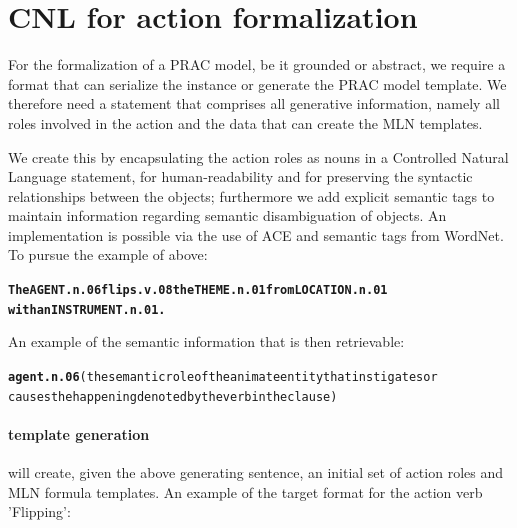 \documentclass[oribibl]{llncs}
\begin{document}
\section{CNL for action formalization}
For the formalization of a PRAC model, be it grounded or abstract, we require a format that can serialize the instance or generate the PRAC model template.
We therefore need a statement that comprises all generative information, namely all roles involved in the action and the data that can create the MLN templates.  

We create this by encapsulating the action roles as nouns in a Controlled Natural Language statement, for human-readability and for preserving the syntactic relationships between the objects; furthermore we add explicit semantic tags to maintain information regarding semantic disambiguation of objects.
An implementation is possible via the use of ACE and semantic tags from WordNet\cite{Miller95wordnet:a}. To pursue the example of above:
\begin{alltt}
\textbf{The AGENT.n.06 flips.v.08 the THEME.n.01 from LOCATION.n.01 \\with an INSTRUMENT.n.01.}
\end{alltt}
An example of the semantic information that is then retrievable:
{\small
\begin{alltt}
\textbf{agent.n.06} {\color{red}(the semantic role of the animate entity that instigates or 
causes the happening denoted by the verb in the clause)}
\end{alltt}}

\paragraph{template generation} will create, given the above generating sentence, an initial set of action roles and MLN formula templates.
An example of the target format for the action verb 'Flipping': 
  
\end{document}
